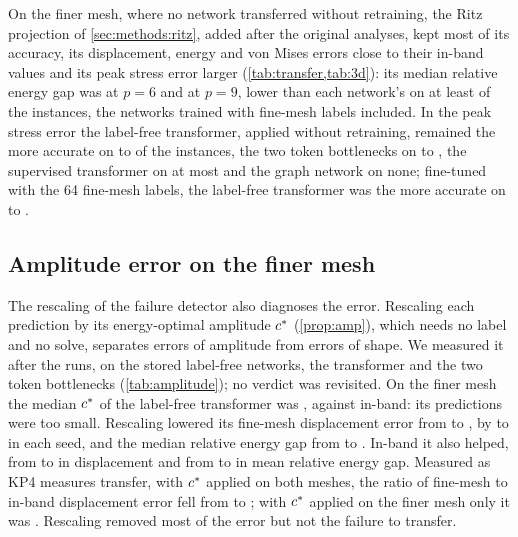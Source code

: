 On the finer mesh, where no network transferred without retraining, the Ritz projection of
\cref{sec:methods:ritz}, added after the original analyses, kept most of its accuracy, its
displacement, energy and von Mises errors close to their in-band values and its peak stress
error larger (\cref{tab:transfer,tab:3d}): its median relative energy gap was
\numRitzFineGapSix{} at $p=6$ and \numRitzFineGapNine{} at $p=9$, lower than each network's
on at least \numRitzFineGapAll{} of the instances, the networks trained with fine-mesh
labels included. In the peak stress error the label-free transformer, applied without
retraining, remained the more accurate on \numRitzFineFreePeakMin{} to
\numRitzFineFreePeakMax{} of the instances, the two token bottlenecks on
\numRitzFineBnPeakMin{} to \numRitzFineBnPeakMax{}, the supervised transformer on at most
\numRitzFineLabPeakMax{} and the graph network on none; fine-tuned with the 64 fine-mesh
labels, the label-free transformer was the more accurate on \numRitzFineFtPeakMin{} to
\numRitzFineFtPeakMax{}.

\subsection{Amplitude error on the finer mesh}\label{sec:transfer:amplitude}



The rescaling of the failure detector also diagnoses the error. Rescaling each prediction
by its energy-optimal amplitude $c^{\ast}$ (\cref{prop:amp}), which needs no label and no
solve, separates errors of amplitude from errors of shape. We measured it after the runs,
on the stored label-free networks, the transformer and the two token bottlenecks
(\cref{tab:amplitude}); no verdict was revisited. On the finer mesh the median $c^{\ast}$ of
the label-free transformer was \numAmpFineCstar{}, against \numAmpInCstar{} in-band: its
predictions were too small. Rescaling lowered its fine-mesh displacement error from
\numAmpFineDisp{} to \numAmpFineDispC{}, by \numAmpFineRedMin{} to \numAmpFineRedMax{} in
each seed, and the median relative energy gap from \numAmpFineGapMedian{} to
\numAmpFineGapMedianC{}. In-band it also helped, from \numAmpInDisp{} to \numAmpInDispC{} in
displacement and from \numAmpInGap{} to \numAmpInGapC{} in mean relative energy gap.
Measured as KP4 measures transfer, with $c^{\ast}$ applied on both meshes, the ratio of
fine-mesh to in-band displacement error fell from \numFineRatio{} to \numAmpRatioBoth{};
with $c^{\ast}$ applied on the finer mesh only it was \numAmpRatioFineOnly{}. Rescaling
removed most of the error but not the failure to transfer.

